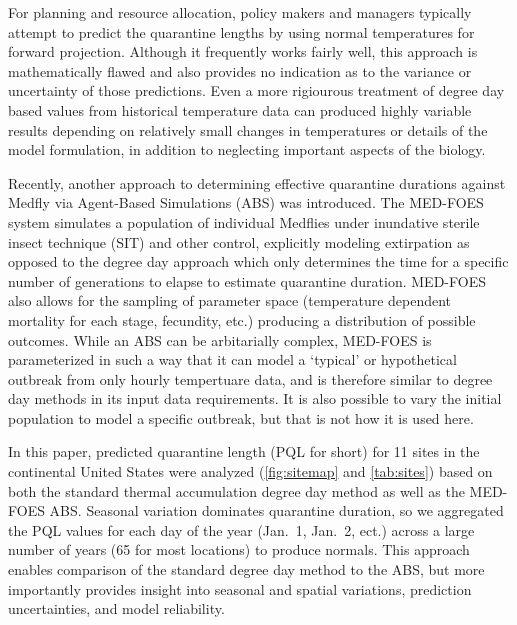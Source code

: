 \documentclass[10pt,a4paper,twocolumn]{article}
\begin{document}
For planning and resource allocation, policy makers and managers 
typically attempt to predict the quarantine lengths by using
normal temperatures for forward projection\cite{??}.
Although it frequently works fairly well,
this approach is mathematically flawed 
and also provides no indication as to the variance or uncertainty
of those predictions.
Even a more rigiourous treatment of degree day based values from
historical temperature data can produced highly variable results
depending on relatively small changes in temperatures or details of
the model formulation\cite{Roltsch1999}, in addition to neglecting
important aspects of the biology.

Recently, another approach to determining effective quarantine 
durations against Medfly via Agent-Based Simulations (ABS)\cite{manoukis_agent-based_2014}
was introduced. 
The MED-FOES system simulates a population of individual Medflies 
under inundative sterile insect technique (SIT) and other control, 
explicitly modeling extirpation as opposed to the degree day 
approach which only determines the time for a specific
number of generations to elapse to estimate quarantine duration.
MED-FOES also allows for the sampling of parameter space
(temperature dependent mortality for each stage, fecundity, etc.)
producing a distribution of possible outcomes.
While an ABS can be arbitarially complex, MED-FOES is parameterized
in such a way that it can model a `typical' or hypothetical outbreak from only hourly tempertuare data,
and is therefore similar to degree day methods in its input data requirements.
It is also possible to vary the initial population to model a specific outbreak, but
that is not how it is used here.

In this paper, predicted quarantine length (PQL for short) 
for 11 sites in the continental United States were analyzed
(\autoref{fig:sitemap} and \autoref{tab:sites})
based on both the standard thermal accumulation degree day method\cite{ECY:ECY1969503514} 
as well as the MED-FOES ABS\cite{manoukis_computer_2014}. 
Seasonal variation dominates quarantine duration, 
so we aggregated the PQL values for each day of the year 
(Jan.\ 1, Jan.\ 2, ect.) 
across a large number of years (65 for most locations) to produce normals.
This approach enables comparison of the standard degree day 
method to the ABS, but more importantly provides insight 
into seasonal and spatial variations, prediction uncertainties, 
and model reliability.
\end{document}
